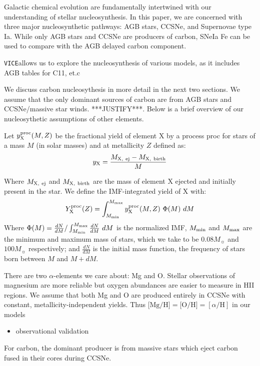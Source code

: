 \documentclass[fleqn,usenatbib]{mnras}
\newcommand{\VICE}{\texttt{VICE}}
\begin{document}
Galactic chemical evolution are fundamentally intertwined with our understanding of stellar nucleosynthesis. In this paper, we are concerned with three major nucleosynthetic pathways: AGB stars, CCSNe, and Supernovae type Ia. While only AGB stars and CCSNe are producers of carbon, SNeIa Fe can be used to compare with the AGB delayed carbon component. 

\VICE allows us to explore the nucleosynthesis of various models, as it includes AGB tables for C11, et.c
    
We discuss carbon nucleosythesis in more detail in the next two sections. We assume that the only dominant sources of carbon are from AGB stars and CCSNe/massive star winds. ***JUSTIFY***. Below  is a brief overview of our  nucleosythetic assumptions of other elements.

Let $y_{\rm X}^{\rm proc}(M, Z)$ be the fractional yield of element X by a process proc for stars of a mass $M$ (in solar masses) and at metallicity $Z$ defined as: 
\begin{equation}
    y_{\rm X} = \frac{M_{\rm X,\ ej} - M_{\rm X,\ birth}}{M}   
\end{equation}

Where $M_{\rm X,\ ej}$ and $M_{\rm X,\ birth}$ are the mass of element X ejected and initially present in the star. 
We define the IMF-integrated yield of X with: 
\begin{equation}
Y_{\rm X}^{\rm proc}(Z) = \int_{M_{\rm min}}^{M_{\rm max}} y_{\rm X}^{\rm proc}(M, Z)\ \Phi(M)  \ dM
\end{equation}
Where $\Phi(M) = \frac{dN}{dM}/ \int_{M_{\rm min}}^{M_{\rm max}} \frac{dN}{dM}\ dM$ is the normalized IMF, $M_{\rm min}$ and $M_{\rm max}$ are the minimum and maximum mass of stars, which we take to be $0.08 M_{\sun}$ and $100 M_{\sun}$ respectively; and $\frac{dN}{dM}$ is the initial mass function, the frequency of stars born between $M$ and $M+dM$.

There are two $\alpha$-elements we care about: Mg and O. Stellar observations of magnesium are more reliable but oxygen abundances are easier to measure in HII regions. We assume that both Mg and O are produced entirely in CCSNe with constant, metallicity-independent yields. Thus $\text{[Mg/H]} = \text{[O/H]} = [\alpha/\text{H}]$ in our models

\begin{itemize}
    \item observational validation
\end{itemize}
For carbon, the dominant producer is from massive stars which eject carbon fused in their cores during CCSNe. 
\end{document}
